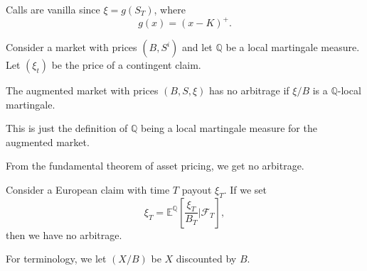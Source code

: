 \documentclass[12pt]{article}
\begin{document}
Calls are vanilla since $\xi = g(S_T)$, where
\[
g(x) = (x - K)^{+}.
\]
\begin{theorem}
	Consider a market with prices $(B, S^{i})$ and let $\mathbb{Q}$ be a local martingale measure. Let $(\xi_t)$ be the price of a contingent claim.

	The augmented market with prices $(B, S, \xi)$ has no arbitrage if $\xi/B$ is a $\mathbb{Q}$-local martingale.
\end{theorem}

\begin{proofbox}
	This is just the definition of $\mathbb{Q}$ being a local martingale measure for the augmented market.

	From the fundamental theorem of asset pricing, we get no arbitrage.
\end{proofbox}

\begin{exbox}
	Consider a European claim with time $T$ payout $\xi_T$. If we set
	\[
	\xi_T = \mathbb{E}^{\mathbb{Q}}\left[ \frac{\xi_T}{B_T} | \mathcal{F}_T \right],
	\]
	then we have no arbitrage.
\end{exbox}

For terminology, we let $(X/B)$ be $X$ discounted by $B$.
\end{document}

